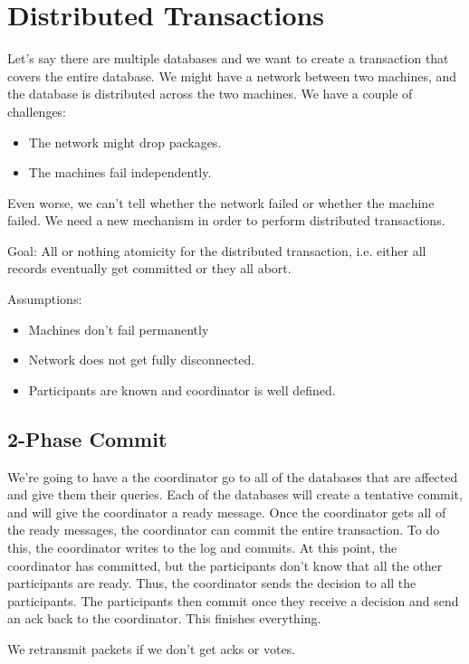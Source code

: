 \documentclass[psamsfonts]{amsart}
\begin{document}
\section{Distributed Transactions}

Let's say there are multiple databases and we want to create a transaction that covers the entire database. We might have a network between two machines, and the database is distributed across the two machines. We have a couple of challenges:
\begin{itemize}
  \item The network might drop packages.
  \item The machines fail independently.
\end{itemize}

Even worse, we can't tell whether the network failed or whether the machine failed. We need a new mechanism in order to perform distributed transactions. 

Goal: All or nothing atomicity for the distributed transaction, i.e. either all records eventually get committed or they all abort.

Assumptions:
\begin{itemize}
  \item Machines don't fail permanently
  \item Network does not get fully disconnected.
  \item Participants are known and coordinator is well defined.
\end{itemize}

\subsection{2-Phase Commit}

We're going to have a the coordinator go to all of the databases that are affected and give them their queries. Each of the databases will create a tentative commit, and will give the coordinator a ready message. Once the coordinator gets all of the ready messages, the coordinator can commit the entire transaction. To do this, the coordinator writes to the log and commits. At this point, the coordinator has committed, but the participants don't know that all the other participants are ready. Thus, the coordinator sends the decision to all the participants. The participants then commit once they receive a decision and send an ack back to the coordinator. This finishes everything.

We retransmit packets if we don't get acks or votes.
\end{document}
